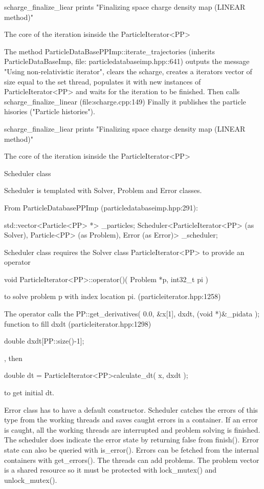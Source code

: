 \documentclass[12pt,a4paper]{article}
\begin{document}
scharge\_finalize\_liear prints "Finalizing space charge density map (LINEAR method)"

The core of the iteration isinside the ParticleIterator<PP>


The method ParticleDataBasePPImp::iterate\_trajectories (inherits ParticleDataBaseImp, file: particledatabaseimp.hpp::641) outputs the message "Using non-relativistic iterator", clears the scharge, creates a iterators vector of size equal to the set thread, populates it with new instances of ParticleIterator<PP> and waits for the iteration to be finished. Then calls scharge\_finalize\_linear (file:scharge.cpp:149) Finally it publishes the particle hisories ("Particle histories").

scharge\_finalize\_liear prints "Finalizing space charge density map (LINEAR method)"

The core of the iteration isinside the ParticleIterator<PP>


Scheduler class 

Scheduler is templated with Solver, Problem and Error classes. 

From ParticleDatabasePPImp (particledatabaseimp.hpp:291):

std::vector<Particle<PP> *>                        _particles;
Scheduler<ParticleIterator<PP> (as Solver), Particle<PP> (as Problem), Error (as Error)> _scheduler;



Scheduler class requires the Solver class ParticleIterator<PP> to provide an operator

  void ParticleIterator<PP>::operator()( Problem *p, int32_t pi )
  
to solve problem p with index location pi. (particleiterator.hpp:1258)

The operator calls the PP::get_derivatives( 0.0, &x[1], dxdt, (void *)&_pidata ); function to 
fill dxdt (particleiterator.hpp:1298)





double dxdt[PP::size()-1];

, then 

double dt = ParticleIterator<PP>calculate_dt( x, dxdt );

to get initial dt.






Error class has to have a default constructor. Scheduler catches
the errors of this type from the working threads and saves caught
errors in a container. If an error is caught, all the working
threads are interrupted and problem solving is finished. The
scheduler does indicate the error state by returning false from
finish(). Error state can also be queried with is_error(). Errors
can be fetched from the internal containers with get_errors().
The %
threads can add problems. The problem vector is a shared resource
so it must be protected with lock_mutex() and unlock_mutex().
\end{document}
